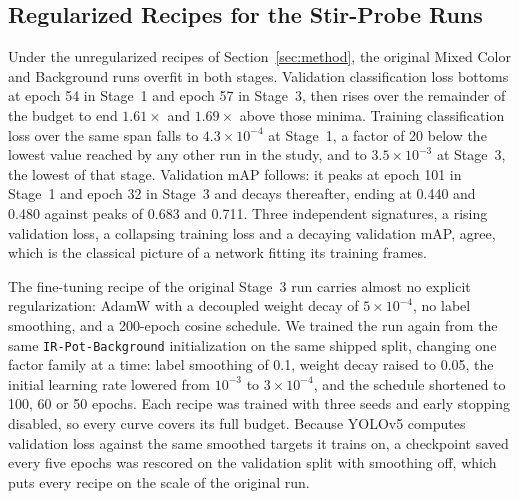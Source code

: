 ﻿\documentclass[journal]{IEEEtran}
\begin{document}
\subsection{Regularized Recipes for the Stir-Probe Runs}
\label{sec:stir-reg}
Under the unregularized recipes of Section~\ref{sec:method}, the original Mixed Color and Background runs overfit in both stages. Validation classification loss bottoms at epoch 54 in Stage~1 and epoch 57 in Stage~3, then rises over the remainder of the budget to end $1.61\times$ and $1.69\times$ above those minima. Training classification loss over the same span falls to $4.3 \times 10^{-4}$ at Stage~1, a factor of 20 below the lowest value reached by any other run in the study, and to $3.5 \times 10^{-3}$ at Stage~3, the lowest of that stage. Validation mAP follows: it peaks at epoch 101 in Stage~1 and epoch 32 in Stage~3 and decays thereafter, ending at 0.440 and 0.480 against peaks of 0.683 and 0.711. Three independent signatures, a rising validation loss, a collapsing training loss and a decaying validation mAP, agree, which is the classical picture of a network fitting its training frames.

The fine-tuning recipe of the original Stage~3 run carries almost no explicit regularization: AdamW with a decoupled weight decay of $5 \times 10^{-4}$, no label smoothing, and a 200-epoch cosine schedule. We trained the run again from the same \texttt{IR-Pot-Background} initialization on the same shipped split, changing one factor family at a time: label smoothing of 0.1, weight decay raised to 0.05, the initial learning rate lowered from $10^{-3}$ to $3 \times 10^{-4}$, and the schedule shortened to 100, 60 or 50 epochs. Each recipe was trained with three seeds and early stopping disabled, so every curve covers its full budget. Because YOLOv5 computes validation loss against the same smoothed targets it trains on, a checkpoint saved every five epochs was rescored on the validation split with smoothing off, which puts every recipe on the scale of the original run.
\end{document}
